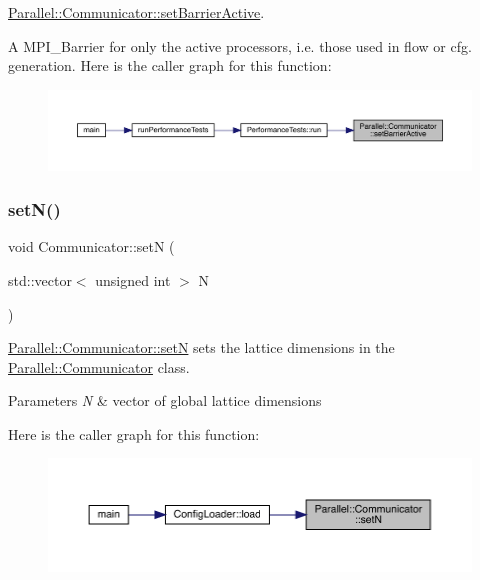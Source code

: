 \mbox{\hyperlink{class_parallel_1_1_communicator_af61a4b8a49509982ae96d2a99dfb9f49}{Parallel\+::\+Communicator\+::set\+Barrier\+Active}}. 

A M\+P\+I\+\_\+\+Barrier for only the active processors, i.\+e. those used in flow or cfg. generation. Here is the caller graph for this function\+:\nopagebreak
\begin{figure}[H]
\begin{center}
\leavevmode
\includegraphics[width=350pt]{class_parallel_1_1_communicator_af61a4b8a49509982ae96d2a99dfb9f49_icgraph}
\end{center}
\end{figure}
\mbox{\label{class_parallel_1_1_communicator_a1db417babab93c8d8bf6339ff2bab540}} 
\subsubsection{\texorpdfstring{setN()}{setN()}}
{\footnotesize\ttfamily void Communicator\+::setN (\begin{DoxyParamCaption}\item[{std\+::vector$<$ unsigned int $>$}]{N }\end{DoxyParamCaption})\hspace{0.3cm}{\ttfamily [static]}}



\mbox{\hyperlink{class_parallel_1_1_communicator_a1db417babab93c8d8bf6339ff2bab540}{Parallel\+::\+Communicator\+::setN}} sets the lattice dimensions in the \mbox{\hyperlink{class_parallel_1_1_communicator}{Parallel\+::\+Communicator}} class. 


\begin{DoxyParams}{Parameters}
{\em N} & vector of global lattice dimensions \\
\hline
\end{DoxyParams}
Here is the caller graph for this function\+:\nopagebreak
\begin{figure}[H]
\begin{center}
\leavevmode
\includegraphics[width=350pt]{class_parallel_1_1_communicator_a1db417babab93c8d8bf6339ff2bab540_icgraph}
\end{center}
\end{figure}


